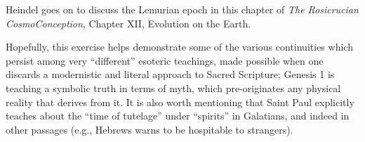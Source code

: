 Heindel goes on to discuss the Lemurian epoch in this chapter of \emph{The Rosicrucian CosmoConception}, Chapter XII, Evolution on the Earth.

Hopefully, this exercise helps demonstrate some of the various continuities which persist among very ``different'' esoteric teachings, made possible when one discards a modernistic and literal approach to Sacred Scripture; Genesis 1 is teaching a symbolic truth in terms of myth, which pre-originates any physical reality that derives from it. It is also worth mentioning that Saint Paul explicitly teaches about the ``time of tutelage'' under ``spirits'' in Galatians, and indeed in other passages (e.g., Hebrews warns to be hospitable to strangers).



